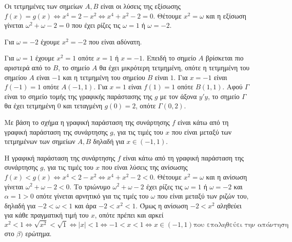 
\begin{alist}
\item Οι τετμημένες των σημείων $A, B$ είναι οι λύσεις της εξίσωσης
$f(x) = g(x) \Leftrightarrow x^4 = 2 - x^2 \Leftrightarrow x^4 + x^2 - 2 = 0$. Θέτουμε $x^2 = \omega$
και η εξίσωση γίνεται $\omega^2 + \omega - 2 = 0$ που έχει ρίζες τις $\omega = 1$ ή $\omega = -2$.

Για $\omega = -2$ έχουμε $x^2 = -2$ που είναι αδύνατη.

Για $\omega = 1$ έχουμε $x^2 = 1$ οπότε $x = 1$ ή $x = -1$.
Επειδή το σημείο $A$ βρίσκεται πιο αριστερά από το $B$, το σημείο $A$ θα έχει
μικρότερη τετμημένη, οπότε η τετμημένη του σημείου $A$ είναι $-1$ και η τετμημένη
του σημείου $B$ είναι $1$.
Για $x = -1$ είναι $f(-1) = 1$ οπότε $A(-1, 1)$.
Για $x = 1$ είναι $f(1) = 1$ οπότε $B(1, 1)$.
Αφού $\Gamma$ είναι το σημείο τομής της γραφικής παράστασης της $g$ με τον άξονα $y'y$,
το σημείο $\Gamma$ θα έχει τετμημένη $0$ και τεταγμένη $g(0) = 2$, οπότε $\Gamma(0, 2)$.

\item Με βάση το σχήμα η γραφική παράσταση της συνάρτησης $f$ είναι κάτω από τη
γραφική παράσταση της συνάρτησης $g$, για τις τιμές του $x$ που είναι μεταξύ των
τετμημένων των σημείων $A, B$ δηλαδή για $x \in (-1, 1)$.

\item Η γραφική παράσταση της συνάρτησης $f$ είναι κάτω από τη γραφική παράσταση
της συνάρτησης $g$, για τις τιμές του $x$ που είναι λύσεις της ανίσωσης
$f(x) < g(x) \Leftrightarrow x^4 < 2 - x^2 \Leftrightarrow x^4 + x^2 - 2 < 0$. Θέτουμε $x^2 = \omega$ και η ανίσωση γίνεται
$\omega^2 + \omega - 2 < 0$. Το τριώνυμο $\omega^2 + \omega - 2$ έχει ρίζες τις $\omega = 1$ ή $\omega = -2$ και $\alpha = 1 > 0$
οπότε γίνεται αρνητικό για τις τιμές του $\omega$ που είναι μεταξύ των ριζών του, δηλαδή
για $-2 < \omega < 1$ και άρα $-2 < x^2 < 1$. Όμως η ανίσωση $-2 < x^2$ αληθεύει για κάθε
πραγματική τιμή του $x$, οπότε πρέπει και αρκεί
\[x^2 < 1 \Leftrightarrow \sqrt{x^2} < \sqrt{1} \Leftrightarrow |x| < 1 \Leftrightarrow -1 < x < 1 \Leftrightarrow x \in (-1, 1)\text{που επαληθεύει την απάντηση}\]
στο $\beta)$ ερώτημα.
\end{alist}

